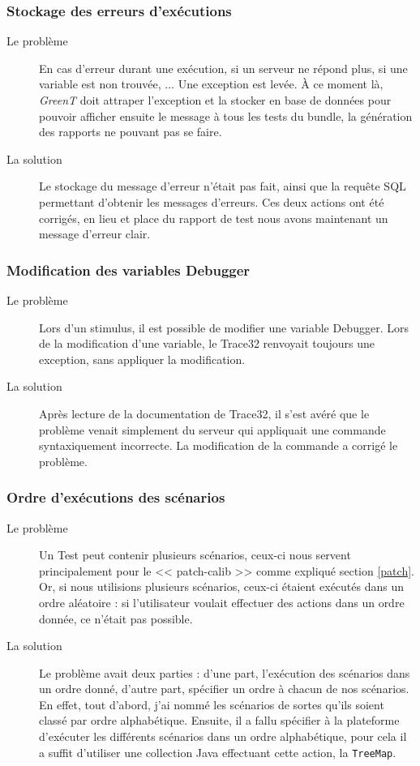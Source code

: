 	\subsubsection{Stockage des erreurs d'exécutions}
	\begin{description}
		\item[Le problème] En cas d'erreur durant une exécution, si un serveur ne répond plus, si une variable est non trouvée, ... Une exception est levée. À ce moment là, \textit{GreenT} doit attraper l'exception et la stocker en base de données pour pouvoir afficher ensuite le message à tous les tests du bundle, la génération des rapports ne pouvant pas se faire.
		\item[La solution] Le stockage du message d'erreur n'était pas fait, ainsi que la requête SQL permettant d'obtenir les messages d'erreurs. Ces deux actions ont été corrigés, en lieu et place du rapport de test nous avons maintenant un message d'erreur clair.
		\end{description}
		
	\subsubsection{Modification des variables Debugger}
		\begin{description}
			\item[Le problème] Lors d'un stimulus, il est possible de modifier une variable Debugger. Lors de la modification d'une variable, le Trace32 renvoyait toujours une exception, sans appliquer la modification.
			\item[La solution] Après lecture de la documentation de Trace32, il s'est avéré que le problème venait simplement du serveur qui appliquait une commande syntaxiquement incorrecte. La modification de la commande a corrigé le problème.
	\end{description}
	
	\subsubsection{Ordre d'exécutions des scénarios}
		\begin{description}
			\item[Le problème] Un Test peut contenir plusieurs scénarios, ceux-ci nous servent principalement pour le << patch-calib >> comme expliqué section \ref{patch}. Or, si nous utilisions plusieurs scénarios, ceux-ci étaient exécutés dans un ordre aléatoire : si l'utilisateur voulait effectuer des actions dans un ordre donnée, ce n'était pas possible.
			\item[La solution] Le problème avait deux parties : d'une part, l'exécution des scénarios dans un ordre donné, d'autre part, spécifier un ordre à chacun de nos scénarios. En effet, tout d'abord, j'ai nommé les scénarios de sortes qu'ils soient classé par ordre alphabétique. Ensuite, il a fallu spécifier à la plateforme d'exécuter les différents scénarios dans un ordre alphabétique, pour cela il a suffit d'utiliser une collection Java effectuant cette action, la \texttt{TreeMap}.
	\end{description}
	
